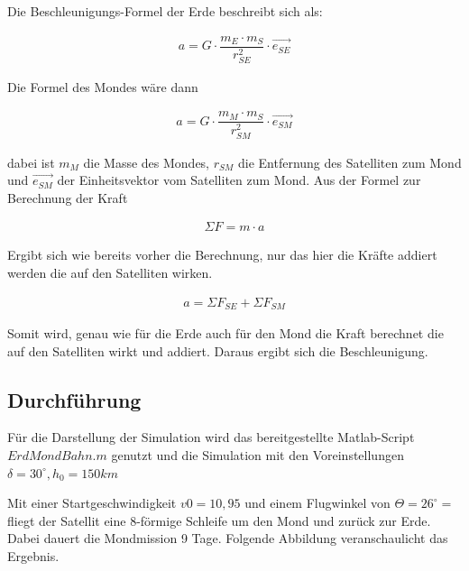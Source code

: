 \documentclass[]{scrartcl}
\begin{document}
Die Beschleunigungs-Formel der Erde beschreibt sich als:

\begin{align}
a = G \cdot \dfrac{m_E \cdot m_S }{r^2_{SE}} \cdot \vec{e_{SE}}
\end{align}

Die Formel des Mondes wäre dann

\begin{align}
a = G \cdot \dfrac{m_M \cdot m_S }{r^2_{SM}} \cdot \vec{e_{SM}}
\end{align}

dabei ist $m_M$ die Masse des Mondes, $r_{SM}$ die Entfernung des Satelliten zum Mond und $ \vec{e_{SM}}$ der Einheitsvektor vom Satelliten zum Mond.
Aus der Formel zur Berechnung der Kraft

\begin{align}
\Sigma{F} = m \cdot a
\end{align}

Ergibt sich wie bereits vorher die Berechnung, nur das hier die Kräfte addiert werden die auf den Satelliten wirken.

\begin{align}
a = \Sigma{F}_{SE} + \Sigma{F}_{SM}
\end{align}

Somit wird, genau wie für die Erde auch für den Mond die Kraft berechnet die auf den Satelliten wirkt und addiert. Daraus ergibt sich die Beschleunigung.


\subsection{Durchführung}

Für die Darstellung der Simulation wird das bereitgestellte Matlab-Script $ErdMondBahn.m$ genutzt und die Simulation mit den Voreinstellungen 
 $\delta = 30^\circ, h_0 = 150km$
 
Mit einer Startgeschwindigkeit $v0 = 10,95$ und einem Flugwinkel von $\Theta = 26^\circ = $ fliegt der Satellit eine 8-förmige Schleife um den Mond und zurück zur Erde. Dabei dauert die Mondmission 9 Tage. Folgende Abbildung veranschaulicht das Ergebnis.
\end{document}
